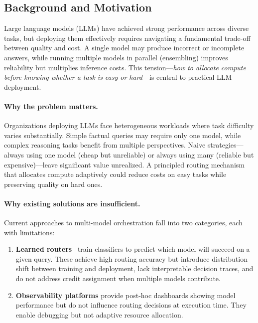 \documentclass{article}
\begin{document}
\subsection{Background and Motivation}

Large language models (LLMs) have achieved strong performance across diverse tasks, but deploying them effectively requires navigating a fundamental trade-off between quality and cost. A single model may produce incorrect or incomplete answers, while running multiple models in parallel (ensembling) improves reliability but multiplies inference costs. This tension---\emph{how to allocate compute before knowing whether a task is easy or hard}---is central to practical LLM deployment.

\paragraph{Why the problem matters.}
Organizations deploying LLMs face heterogeneous workloads where task difficulty varies substantially. Simple factual queries may require only one model, while complex reasoning tasks benefit from multiple perspectives. Naive strategies---always using one model (cheap but unreliable) or always using many (reliable but expensive)---leave significant value unrealized. A principled routing mechanism that allocates compute adaptively could reduce costs on easy tasks while preserving quality on hard ones.

\paragraph{Why existing solutions are insufficient.}
Current approaches to multi-model orchestration fall into two categories, each with limitations:

\begin{enumerate}[leftmargin=*, itemsep=2pt]
    \item \textbf{Learned routers}~\citep{routerbench, frugalgpt, routellm} train classifiers to predict which model will succeed on a given query. These achieve high routing accuracy but introduce distribution shift between training and deployment, lack interpretable decision traces, and do not address credit assignment when multiple models contribute.

    \item \textbf{Observability platforms} provide post-hoc dashboards showing model performance but do not influence routing decisions at execution time. They enable debugging but not adaptive resource allocation.
\end{enumerate}
\end{document}
